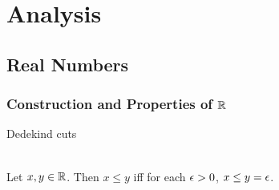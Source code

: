 \documentclass{book}
\begin{document}
	
	
	
	
	
	
	
	
	
	
	
	
	
	
	
	
	
	
	
	
	
	
	
	
	
	
	
	
	
	
	
	
	
	
	
	
	
	
	
	
	
	
	
	
	
	
	
	
	
	
	
	
	
	
	
	
	\part{Analysis}
	
	\chapter{Real Numbers}
	
	\section{Construction and Properties of $\mathbb{R}$}
	
	\begin{defn}
	\end{defn}
	
	\begin{defn}
		Dedekind cuts
	\end{defn}
	
	\begin{ex}  \\
		Let $x, y \in \mathbb{R}$. Then $x \leq y$ iff for each $\epsilon > 0$, $x \leq y = \epsilon$. 
	\end{ex}
	
\end{document}
